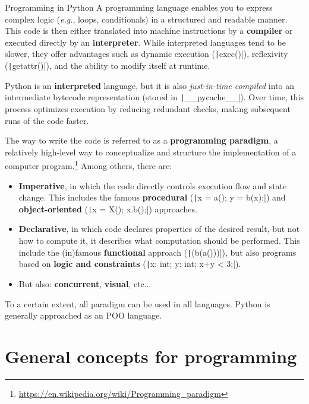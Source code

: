 \documentclass[10pt,
aspectratio=169
]{beamer}
\begin{document}
\begin{frame}{Programming in Python}
	A programming language enables you to express complex logic (\textit{e.g.}, loops, conditionals) in a structured and readable manner. This code is then either translated into machine instructions by a \textbf{compiler} or executed directly by an \textbf{interpreter}. While interpreted languages tend to be slower, they offer advantages such as dynamic execution (\texttt|exec()|), reflexivity (\texttt|getattr()|), and the ability to modify itself at runtime.
	
	Python is an \textbf{interpreted} language, but it is also \textit{just-in-time compiled} into an intermediate bytecode representation (stored in \texttt|__pycache__|). Over time, this process optimizes execution by reducing redundant checks, making subsequent runs of the code faster.
\end{frame}



\begin{frame}[fragile]
	The way to write the code is referred to as a \textbf{programming paradigm}, a relatively high-level way to conceptualize and structure the implementation of a computer program.\footnote{\url{https://en.wikipedia.org/wiki/Programming_paradigm}} Among others, there are:\begin{itemize}
		\item \textbf{Imperative}, in which the code directly controls execution flow and state change. This includes the famous \textbf{procedural} (\texttt|x = a(); y = b(x);|) and \textbf{object-oriented} (\texttt|x = X(); x.b();|) approaches.
		\item \textbf{Declarative}, in which code declares properties of the desired result, but not how to compute it, it describes what computation should be performed. This include the (in)famous \textbf{functional} approach (\texttt|(b(a()))|), but also programs based on \textbf{logic and constraints} (\texttt|x: int; y: int; x+y < 3;|).
		\item But also: \textbf{concurrent}, \textbf{visual}, etc...
	\end{itemize}
	
	To a certain extent, all paradigm can be used in all languages. Python is generally approached as an POO language.
	\vspace{1em}
\end{frame}

\section{General concepts for programming}
\end{document}
